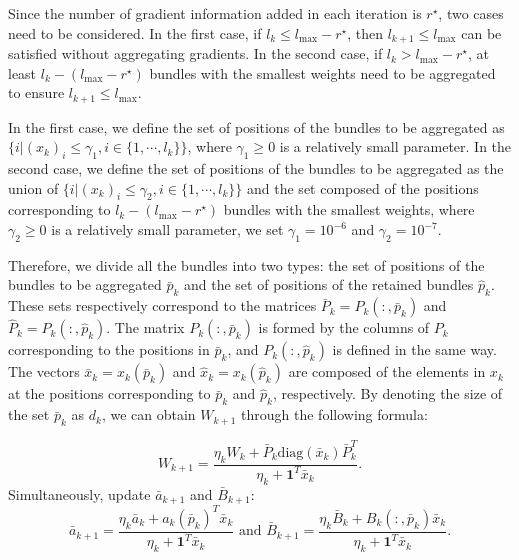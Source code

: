 \documentclass{jcmlatex}
\begin{document}
Since the number of gradient information added in each iteration is \(r^{\star}\), two cases need to be considered. In the first case, if \(l_{k}\leq l_{\max}-r^{\star}\), then \(l_{k + 1}\leq l_{\max}\) can be satisfied without aggregating gradients. In the second case, if \(l_{k}>l_{\max}-r^{\star}\), at least \(l_{k}-(l_{\max}-r^{\star})\) bundles with the smallest weights need to be aggregated to ensure \(l_{k+1}\leq l_{\max}\).

In the first case, we define the set of positions of the bundles to be aggregated as \(\{i|(x_{k})_{i}\leq\gamma_{1},i\in\{1,\cdots,l_{k}\}\}\), where \(\gamma_{1}\geq0\) is a relatively small parameter. In the second case, we define the set of positions of the bundles to be aggregated as the union of \(\{i|(x_{k})_{i}\leq\gamma_{2},i\in\{1,\cdots,l_{k}\}\}\) and the set composed of the positions corresponding to \(l_{k}-(l_{\max}-r^{\star})\) bundles with the smallest weights, where \(\gamma_{2}\geq0\) is a relatively small parameter, we set \(\gamma_1 = 10^{-6}\) and \(\gamma_{2}= 10^{-7}\).

Therefore, we divide all the bundles into two types: the set of positions of the bundles to be aggregated \(\bar{p}_{k}\) and the set of positions of the retained bundles \(\hat{p}_{k}\). These sets respectively correspond to the matrices \(\bar{P}_{k} = P_{k}(:, \bar{p}_{k})\) and \(\hat{P}_{k} = P_{k}(:, \hat{p}_{k})\). The matrix \(P_k(:, \bar{p}_k)\) is formed by the columns of \(P_k\) corresponding to the positions in \(\bar{p}_k\), and \(P_k(:, \hat{p}_k)\) is defined in the same way. The vectors \(\bar{x}_{k} = x_{k}(\bar{p}_{k})\) and \(\hat{x}_{k} = x_{k}(\hat{p}_{k})\) are composed of the elements in \(x_k\) at the positions corresponding to \(\bar{p}_k\) and \(\hat{p}_k\), respectively. By denoting the size of the set \(\bar{p}_{k}\) as \(d_{k}\), we can obtain \(W_{k+1}\) through the following formula:

\begin{equation}\label{eq:update1}
W_{k+1}=\frac{\eta_{k}W_{k}+\bar{P}_{k}\text{diag}(\bar{x}_{k})\bar{P}_{k}^{T}}{\eta_{k}+\textbf{1}^{T}\bar{x}_{k}}.
\end{equation}
Simultaneously, update \(\bar{a}_{k+1}\) and \(\bar{B}_{k+1}\):
\begin{equation}\label{eq:update2}
\bar{a}_{k+1}=\frac{\eta_{k}\bar{a}_{k}+a_{k}(\bar{p}_{k})^{T}\bar{x}_{k}}{\eta_{k}+\textbf{1}^{T}\bar{x}_{k}}
\text{ and }
\bar{B}_{k+1}=\frac{\eta_{k}\bar{B}_{k}+B_{k}(:,\bar{p}_{k})\bar{x}_{k}}{\eta_{k}+\textbf{1}^{T}\bar{x}_{k}}.
\end{equation}
\end{document}

